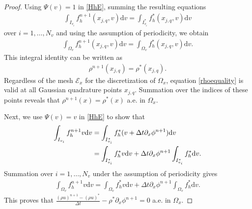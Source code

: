 \documentclass[10pt,a4paper]{amsart}
\begin{document}
\begin{proof}
Using $\Psi(v)=1$ in \eqref{HhE}, summing the resulting equations
\begin{align}
    \int_{I_{v_i}}f_h^{n+1}(x_{j,q},v)\mathrm dv=\int_{I_{v_i}^*}f_h^*(x_{j,q},v)\mathrm dv
\end{align}
 over $i=1,\ldots,N_v$ and using the assumption of periodicity, we obtain
\begin{align}\label{0m}
    \int_{\Omega_v}f_h^{n+1}(x_{j,q},v)\mathrm dv=\int_{\Omega_v}f_h^*(x_{j,q},v)\mathrm dv.
\end{align}
This integral identity can be written as
\begin{align}\label{rhoequality}
    \rho^{n+1}(x_{j,q})=\rho^*(x_{j,q}).
\end{align}
Regardless of the mesh $\mathcal{E}_x$ for the discretization of $\Omega_x$, equation \eqref{rhoequality} is valid at all Gaussian quadrature points $x_{j,q}$. Summation over the indices of these points reveals that $\rho^{n+1}(x)=\rho^*(x)$ a.e. in
$\Omega_x$.

Next, we use $\Psi(v)=v$ in \eqref{HhE} to show that
\begin{align}
    \int_{I_{v_i}}f_h^{n+1}v\mathrm dv&=\int_{I_{v_i}^*}f_h^*(v+\Delta t\partial_x\phi^{n+1})\mathrm dv\notag\\
    &=\int_{I_{v_i}^*}f_h^*v\mathrm dv+\Delta t\partial_x\phi^{n+1}\int_{I_{v_i}^*}f_h^*
    \mathrm dv.
\end{align}
Summation 
over $i=1,\ldots,N_v$ under the assumption of periodicity gives
\begin{align}\label{1m}
    \int_{\Omega_v}f_h^{n+1}v\mathrm dv=\int_{\Omega_v}f_h^*v\mathrm dv
    +\Delta t\partial_x\phi^{n+1}\int_{\Omega_v}f_h^*\mathrm dv.
\end{align}
This proves that
$\frac{(\rho u)^{n+1}-(\rho u)^*}{\Delta t}-\rho^*\partial_x\phi^{n+1}=0$
a.e. in $\Omega_x$.


\end{proof}
\end{document}

